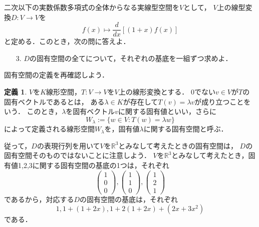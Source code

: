 \documentclass{jsarticle}
\theoremstyle{definition}
\newtheorem{defi}{定義}[section]
\begin{document}
\begin{screen}
二次以下の実数係数多項式の全体からなる実線型空間を$V$として，
$V$上の線型変換$D\colon V\to V$を
\[ f(x)\mapsto\frac{d}{dx}[(1+x)f(x)] \]
と定める．このとき，次の問に答えよ．
\begin{itemize}
\item[3.]$D$の固有空間の全てについて，それぞれの基底を一組ずつ求めよ．
\end{itemize}
\end{screen}

固有空間の定義を再確認しよう．

\begin{boxnote}\begin{defi}
$V$を$K$線形空間，$T: V\to V$を$V$上の線形変換とする．
0でない$v\in V$が$T$の固有ベクトルであるとは，
ある$\lambda\in K$が存在して$T(v)=\lambda v$が成り立つことをいう．
このとき，$\lambda$を固有ベクトル$v$に関する固有値といい，さらに
\[ W_\lambda:=\{w\in V:T(w)=\lambda w\} \]
によって定義される線形空間$W_\lambda$を，固有値$\lambda$に関する固有空間と呼ぶ．
\end{defi}\end{boxnote}

従って，$D$の表現行列を用いて$V$を$\mathbb{R}^3$とみなして考えたときの固有空間は，
$D$の固有空間そのものではないことに注意しよう．
$V$を$\mathbb{R}^3$とみなして考えたとき，固有値1,2,3に関する固有空間の基底の1つは，それぞれ
\[ \begin{pmatrix}1\\0\\0\end{pmatrix},\begin{pmatrix}1\\1\\0\end{pmatrix},
\begin{pmatrix}1\\2\\1\end{pmatrix} \]
であるから，対応する$D$の固有空間の基底は，それぞれ
\[ 1,1+(1+2x),1+2(1+2x)+(2x+3x^2) \]
である．
\end{document}
